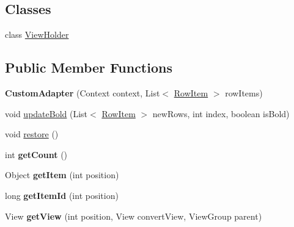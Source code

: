 \subsection*{Classes}
\begin{DoxyCompactItemize}
\item 
class \hyperlink{classcom_1_1example_1_1sebastian_1_1tindertp_1_1chatListTools_1_1CustomAdapter_1_1ViewHolder}{View\+Holder}
\end{DoxyCompactItemize}
\subsection*{Public Member Functions}
\begin{DoxyCompactItemize}
\item 
{\bfseries Custom\+Adapter} (Context context, List$<$ \hyperlink{classcom_1_1example_1_1sebastian_1_1tindertp_1_1chatListTools_1_1RowItem}{Row\+Item} $>$ row\+Items)\hypertarget{classcom_1_1example_1_1sebastian_1_1tindertp_1_1chatListTools_1_1CustomAdapter_aba04e26fba7bea06e3f5c8b0d91c8ec2}{}\label{classcom_1_1example_1_1sebastian_1_1tindertp_1_1chatListTools_1_1CustomAdapter_aba04e26fba7bea06e3f5c8b0d91c8ec2}

\item 
void \hyperlink{classcom_1_1example_1_1sebastian_1_1tindertp_1_1chatListTools_1_1CustomAdapter_a50145336c0020de96d4fc7135c34e138}{update\+Bold} (List$<$ \hyperlink{classcom_1_1example_1_1sebastian_1_1tindertp_1_1chatListTools_1_1RowItem}{Row\+Item} $>$ new\+Rows, int index, boolean is\+Bold)
\item 
void \hyperlink{classcom_1_1example_1_1sebastian_1_1tindertp_1_1chatListTools_1_1CustomAdapter_a84395a100fc80e3ae2bc614497003fc5}{restore} ()
\item 
int {\bfseries get\+Count} ()\hypertarget{classcom_1_1example_1_1sebastian_1_1tindertp_1_1chatListTools_1_1CustomAdapter_aeb208fb87cab994c0f2def005b9b76f0}{}\label{classcom_1_1example_1_1sebastian_1_1tindertp_1_1chatListTools_1_1CustomAdapter_aeb208fb87cab994c0f2def005b9b76f0}

\item 
Object {\bfseries get\+Item} (int position)\hypertarget{classcom_1_1example_1_1sebastian_1_1tindertp_1_1chatListTools_1_1CustomAdapter_a13c8a00b31faddc336d628afaaa83846}{}\label{classcom_1_1example_1_1sebastian_1_1tindertp_1_1chatListTools_1_1CustomAdapter_a13c8a00b31faddc336d628afaaa83846}

\item 
long {\bfseries get\+Item\+Id} (int position)\hypertarget{classcom_1_1example_1_1sebastian_1_1tindertp_1_1chatListTools_1_1CustomAdapter_a69e9e1b193640947f6faf1ac279f6c45}{}\label{classcom_1_1example_1_1sebastian_1_1tindertp_1_1chatListTools_1_1CustomAdapter_a69e9e1b193640947f6faf1ac279f6c45}

\item 
View {\bfseries get\+View} (int position, View convert\+View, View\+Group parent)\hypertarget{classcom_1_1example_1_1sebastian_1_1tindertp_1_1chatListTools_1_1CustomAdapter_aaecb8b8fbf62b27f875306fe50b2805e}{}\label{classcom_1_1example_1_1sebastian_1_1tindertp_1_1chatListTools_1_1CustomAdapter_aaecb8b8fbf62b27f875306fe50b2805e}

\end{DoxyCompactItemize}
